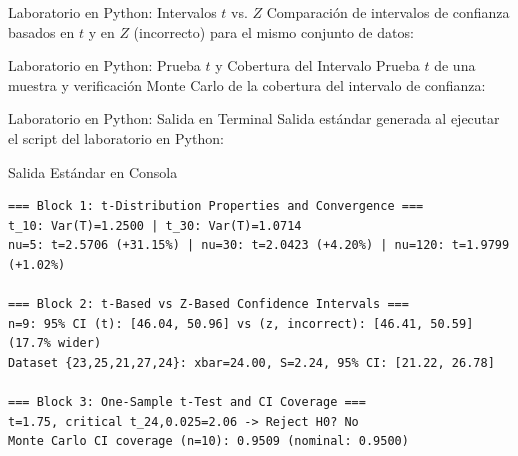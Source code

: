 \documentclass[10pt, aspectratio=169]{beamer}
\begin{document}
\begin{frame}[fragile]{Laboratorio en Python: Intervalos $t$ vs. $Z$}
  \scriptsize
  Comparación de intervalos de confianza basados en $t$ y en $Z$ (incorrecto) para el mismo conjunto de datos:
  {
  }
\end{frame}

\begin{frame}[fragile]{Laboratorio en Python: Prueba $t$ y Cobertura del Intervalo}
  \scriptsize
  Prueba $t$ de una muestra y verificación Monte Carlo de la cobertura del intervalo de confianza:
  {
  }
\end{frame}

\begin{frame}[fragile]{Laboratorio en Python: Salida en Terminal}
  \scriptsize
  Salida estándar generada al ejecutar el script del laboratorio en Python:
  \vspace{0.02cm}
  \begin{block}{Salida Estándar en Consola}
    \fontsize{4pt}{5pt}\selectfont
    \begin{verbatim}
=== Block 1: t-Distribution Properties and Convergence ===
t_10: Var(T)=1.2500 | t_30: Var(T)=1.0714
nu=5: t=2.5706 (+31.15%) | nu=30: t=2.0423 (+4.20%) | nu=120: t=1.9799 (+1.02%)

=== Block 2: t-Based vs Z-Based Confidence Intervals ===
n=9: 95% CI (t): [46.04, 50.96] vs (z, incorrect): [46.41, 50.59] (17.7% wider)
Dataset {23,25,21,27,24}: xbar=24.00, S=2.24, 95% CI: [21.22, 26.78]

=== Block 3: One-Sample t-Test and CI Coverage ===
t=1.75, critical t_24,0.025=2.06 -> Reject H0? No
Monte Carlo CI coverage (n=10): 0.9509 (nominal: 0.9500)
    \end{verbatim}
  \end{block}
\end{frame}
\end{document}
